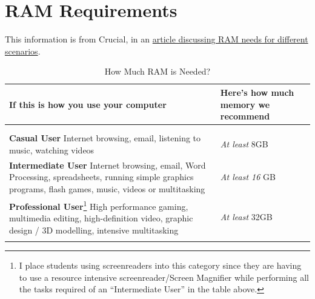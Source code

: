 \documentclass[14pt,letterpaper,twoside]{extreport}
\begin{document}
\pagebreak \hypertarget{ram-requirements}{%
	\section{RAM Requirements}\label{ram-requirements}}


This information is from Crucial, in an \href{https://www.crucial.com/articles/about-memory/how-much-ram-does-my-computer-need}{article discussing RAM needs for different scenarios}.

\begin{longtable}[]{@{}>{\raggedright\arraybackslash}m{}>{\raggedright\arraybackslash}m{}@{}}
	\toprule\noalign{}

	\textbf{If this is how you use your computer}                                                                                                                                                                                                                                                                                                                                                         & \textbf{Here's how much memory we recommend} \\
	\midrule\noalign{}
	\endhead \hline \\
\multicolumn{2}{r}{\textbf{Continued on Next Page}}\\
\endfoot

	\endlastfoot
	\textbf{Casual User} \break Internet browsing, email, listening to music, watching videos                                                                                                                                                                                                                                                                                                             & \emph{At least} 8GB                          \\[2.5em]
	\textbf{Intermediate User} \break Internet browsing, email, Word Processing, spreadsheets, running simple graphics programs, flash games, music, videos or multitasking                                                                                                                                                                                                                               & \emph{At least 16} GB                        \\[2.5em]
	\textbf{Professional User}\footnote{I place students using screenreaders into this category since they are having to use a resource intensive screenreader/Screen Magnifier while performing all the tasks required of an ``Intermediate User'' in the table above.} \break High performance gaming, multimedia editing, high-definition video, graphic design / 3D modelling, intensive multitasking & \emph{At least} 32GB                         \\[2.5em] \hline
	\caption{How Much RAM is Needed?}
\end{longtable}
\end{document}

